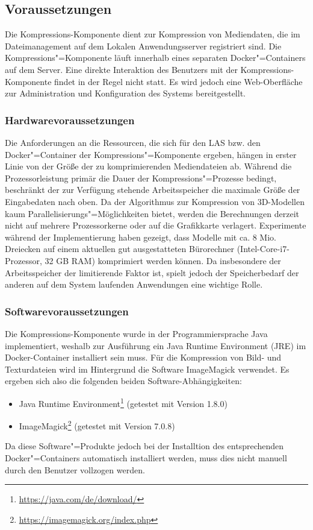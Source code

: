 \subsection{Voraussetzungen}

Die Kompressions-Komponente dient zur Kompression von Mediendaten, die im Dateimanagement auf dem Lokalen Anwendungsserver registriert sind. Die Kompressions"=Komponente läuft innerhalb eines separaten Docker"=Containers auf dem Server. Eine direkte Interaktion des Benutzers mit der Kompressions-Komponente findet in der Regel nicht statt. Es wird jedoch eine Web-Oberfläche zur Administration und Konfiguration des Systems bereitgestellt.

\subsubsection{Hardwarevoraussetzungen}
\label{schlenke:chp:info:hardware}

Die Anforderungen an die Ressourcen, die sich für den LAS bzw. den Docker"=Container der Kompressions"=Komponente ergeben, hängen in erster Linie von der Größe der zu komprimierenden Mediendateien ab. Während die Prozessorleistung primär die Dauer der Kompressions"=Prozesse bedingt, beschränkt der zur Verfügung stehende Arbeitsspeicher die maximale Größe der Eingabedaten nach oben.
Da der Algorithmus zur Kompression von 3D-Modellen kaum Parallelisierungs"=Möglichkeiten bietet, werden die Berechnungen derzeit nicht auf mehrere Prozessorkerne oder auf die Grafikkarte verlagert. 
Experimente während der Implementierung haben gezeigt, dass Modelle mit ca. 8 Mio. Dreiecken auf einem aktuellen gut ausgestatteten Bürorechner (Intel-Core-i7-Prozessor, 32 GB RAM) komprimiert werden können. Da insbesondere der Arbeitsspeicher der limitierende Faktor ist, spielt jedoch der Speicherbedarf der anderen auf dem System laufenden Anwendungen eine wichtige Rolle.

\subsubsection{Softwarevoraussetzungen}

Die Kompressions-Komponente wurde in der Programmiersprache Java implementiert, weshalb zur Ausführung ein Java Runtime Environment (JRE) im Docker-Container installiert sein muss. Für die Kompression von Bild- und Texturdateien wird im Hintergrund die Software ImageMagick verwendet. Es ergeben sich also die folgenden beiden Software-Abhängigkeiten:
\begin{itemize}
\item Java Runtime Environment\footnote{\url{https://java.com/de/download/}} (getestet mit Version 1.8.0)
\item ImageMagick\footnote{\url{https://imagemagick.org/index.php}} (getestet mit Version 7.0.8)
\end{itemize}
Da diese Software"=Produkte jedoch bei der Installtion des entsprechenden Docker"=Containers automatisch installiert werden, muss dies nicht manuell durch den Benutzer vollzogen werden.

